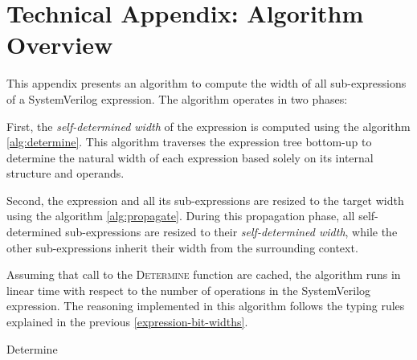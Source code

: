 \documentclass{article}
\newcommand{\add}{\color{darkgreen}}
\newcommand{\sds}{\emph{self-determined width}}
\begin{document}
{

  \add{}
  \section{Technical Appendix: Algorithm Overview}
  \label{algorithm-overview}

  This appendix presents an algorithm to compute the width of all sub-expressions
  of a SystemVerilog expression. The algorithm operates in two phases:

  First, the \sds{} of the expression is computed using the algorithm
  \ref{alg:determine}. This algorithm traverses the expression
  tree bottom-up to determine the natural width of each expression based solely on
  its internal structure and operands.

  Second, the expression and all its sub-expressions are resized to the target
  width using the algorithm \ref{alg:propagate}. During this
  propagation phase, all self-determined sub-expressions are resized to their
  \sds{}, while the other sub-expressions inherit their width from the surrounding
  context.

  Assuming that call to the \textsc{Determine} function are cached, the algorithm
  runs in linear time with respect to the number of operations in
  the SystemVerilog expression. The reasoning implemented in this algorithm
  follows the typing rules explained in the previous
  \autoref{expression-bit-widths}.


  \newcommand\Determine[1]{\textsc{determine}(#1)}
  \newcommand\Propagate[1]{\textsc{propagate}(#1)}

  \begin{algorithm}
    \caption{Determine}
    \label{alg:determine}


    \DontPrintSemicolon
    \SetAlgoVlined
    \LinesNumbered


\end{algorithm}}
\end{document}
